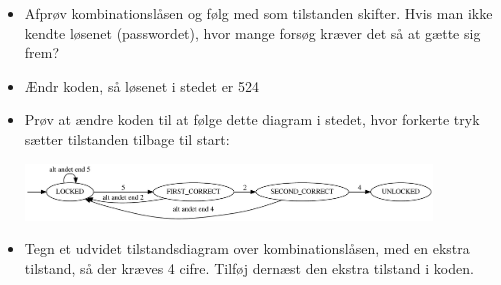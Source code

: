 \documentclass{ucph-handout}
\begin{document}
\begin{exercisebox}[adjusted title=Kombinationslås]
\begin{itemize}
\item  Afprøv kombinationslåsen og følg med som tilstanden skifter. Hvis man
ikke kendte løsenet (passwordet), hvor mange forsøg kræver det så
at gætte sig frem?

\item Ændr koden, så løsenet i stedet er 524
\item Prøv at ændre koden til at følge dette diagram i stedet, hvor
  forkerte tryk sætter tilstanden tilbage til start:
  
\includegraphics[width=0.85\textwidth]{../illustrations/graphviz/combinationLock_resetting}

\item Tegn et udvidet tilstandsdiagram over kombinationslåsen, med en ekstra
  tilstand, så der kræves 4 cifre. Tilføj dernæst den ekstra tilstand i koden.
\end{itemize}
\end{exercisebox}
\end{document}
